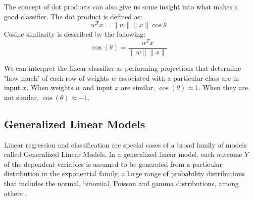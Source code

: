 \documentclass[twoside]{article}
\begin{document}
The concept of dot products can also give us some insight into what makes a good classifier.
The dot product is defined as:
$$w^T x = \|w\| \|x\| \cos \theta$$
Cosine similarity is described by the following:
$$\cos(\theta) = \frac{w^Tx}{\| w \| \|x\|} $$

We can interpret the linear classifier as performing projections that determine "how much" of each row of weights $w$ associated with a particular class are in input $x$. When weights $w$ and input $x$ are similar, $\cos(\theta) \approx 1$. When they are not similar, $\cos(\theta) \approx -1$.

\subsection{Generalized Linear Models}
Linear regression and classification  are special cases of a broad family of models called Generalized Linear Models. In a generalized linear model, each outcome $Y$ of the dependent variables is assumed to be generated from a particular distribution in the exponential family, a large range of probability distributions that includes the normal, binomial, Poisson and gamma distributions, among others \cite{10.2307/2344614}.
\end{document}
